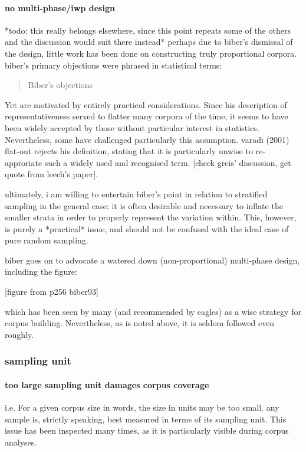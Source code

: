 \paragraph{ no multi-phase/iwp design}
*todo: this really belongs elsewhere, since this point repeats some of the others and the discussion would suit there instead*
perhaps due to biber's dismissal of the design, little work has been done on constructing truly proportional corpora.  biber's primary objections were phrased in statistical terms:

\begin{quotation}
Biber's objections
\end{quotation}

Yet are motivated by entirely practical considerations. Since his description of representativeness served to flatter many corpora of the time, it seems to have been widely accepted by those without particular interest in statistics. Nevertheless, some have challenged particularly this assumption.  varadi (2001) flat-out rejects his definition, stating that it is particularly unwise to re-approriate such a widely used and recognised term.  [check greis' discussion, get quote from leech's paper].

ultimately, i am willing to entertain biber's point in relation to stratified sampling in the general case: it is often desirable and necessary to inflate the smaller strata in order to properly represent the variation within. This, however, is purely a *practical* issue, and should not be confused with the ideal case of pure random sampling.

biber goes on to advocate a watered down (non-proportional) multi-phase design, including the figure:

[figure from p256 biber93]

which has been seen by many (and recommended by eagles) as a wise strategy for corpus building. Nevertheless, as is noted above, it is seldom followed even roughly.


\subsubsection{sampling unit}

\paragraph{ too large sampling unit damages corpus coverage}
i.e. For a given corpus size in words, the size in units may be too small.
any sample is, strictly speaking, best measured in terms of its sampling unit. This issue has been inspected many times, as it is particularly visible during corpus analyses.

